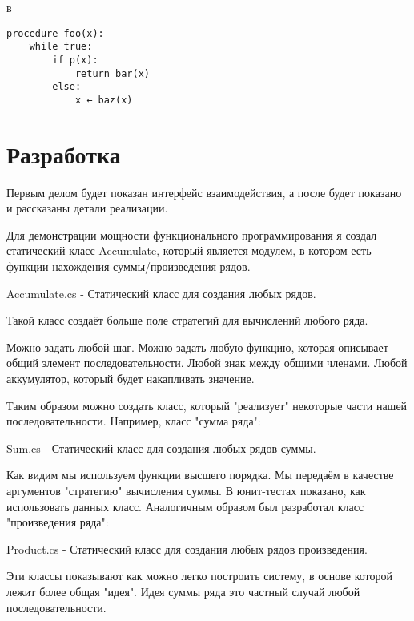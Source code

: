 в

\begin{verbatim}
procedure foo(x):
	while true:
		if p(x):
			return bar(x)
		else:
			x ← baz(x)
\end{verbatim}

\newpage
\section{Разработка}

Первым делом будет показан интерфейс взаимодействия, а после будет показано и рассказаны детали реализации.

Для демонстрации мощности функционального программирования я создал статический класс Accumulate, который является модулем, в котором есть функции нахождения суммы/произведения рядов. 

\begin{code}
	
	\caption{Accumulate.cs - Статический класс для создания любых рядов.}
\end{code}

Такой класс создаёт больше поле стратегий для вычислений любого ряда.

Можно задать любой шаг. Можно задать любую функцию, которая описывает общий элемент последовательности. Любой знак между общими членами. Любой аккумулятор, который будет накапливать значение.

Таким образом можно создать класс, который "реализует" некоторые части нашей последовательности. Например, класс "сумма ряда":

\begin{code}
	
	\caption{Sum.cs - Статический класс для создания любых рядов суммы.}
\end{code}

Как видим мы используем функции высшего порядка. Мы передаём в качестве аргументов "стратегию" вычисления суммы.
В юнит-тестах показано, как использовать данных класс.
Аналогичным образом был разработал класс "произведения ряда":

\begin{code}
	
	\caption{Product.cs - Статический класс для создания любых рядов произведения.}
\end{code}

Эти классы показывают как можно легко построить систему, в основе которой лежит более общая "идея".
Идея суммы ряда это частный случай любой последовательности.


